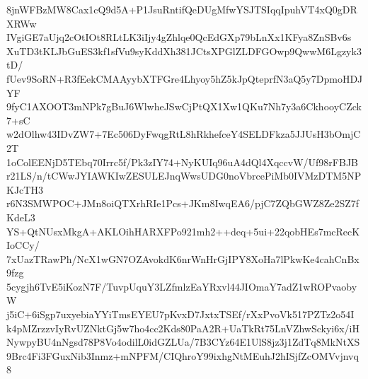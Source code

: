 8jnWFBzMW8Cax1cQ9d5A+P1JsuRntifQeDUgMfwYSJTSIqqIpuhVT4xQ0gDRXRWw
IVgiGE7aUjq2cOtIOt8RLtLK3iIjy4gZhlqe0QcEdGXp79bLnXx1KFya8ZnSBv6s
XuTD3tKLJbGuES3kf1sfVu9syKddXh381JCtsXPGlZLDFGOwp9QwwM6Lgzyk3tD/
fUev9SoRN+R3fEekCMAAyybXTFGre4Lhyoy5hZ5kJpQteprfN3aQ5y7DpmoHDJYF
9fyC1AXOOT3mNPk7gBuJ6WlwheJSwCjPtQX1Xw1QKu7Nh7y3a6CkhooyCZck7+sC
w2dOlhw43IDvZW7+7Ec506DyFwqgRtL8hRkhefceY4SELDFkza5JJUsH3bOmjC2T
1oColEENjD5TEbq70Irrc5f/Pk3zIY74+NyKUIq96uA4dQl4XqccvW/Uf98rFBJB
r21LS/n/tCWwJYIAWKIwZESULEJnqWwsUDG0noVbrcePiMb0IVMzDTM5NPKJcTH3
r6N3SMWPOC+JMn8oiQTXrhRIe1Pcs+JKm8IwqEA6/pjC7ZQbGWZ8Ze2SZ7fKdeL3
YS+QtNUsxMkgA+AKLOihHARXFPo921mh2++deq+5ui+22qobHEs7mcRecKIoCCy/
7xUazTRawPh/NcX1wGN7OZAvokdK6nrWnHrGjIPY8XoHa7lPkwKe4cahCnBx9fzg
5cygjh6TvE5iKozN7F/TuvpUquY3LZfmlzEaYRxvl44JIOmaY7adZ1wROPvaobyW
j5iC+6iSgp7uxyebiaYYiTmsEYEU7pKvxD7JxtxTSEf/rXxPvoVk517PZTz2o54I
k4pMZrzzvIyRvUZNktGj5w7ho4cc2Kds80PaA2R+UaTkRt75LnVZhwSckyi6x/iH
NywpyBU4nNgsd78P8Vo4odilL0idGZLUa/7B3CYz64E1UlS8jz3j1ZdTq8MkNtXS
9Brc4Fi3FGuxNib3Inmz+mNPFM/CIQhroY99ixhgNtMEuhJ2hISjfZcOMVvjnvq8
